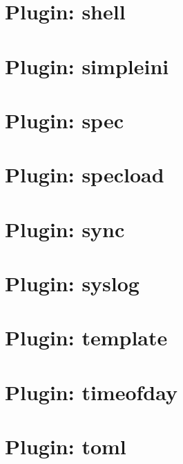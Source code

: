 \let\mypdfximage\pdfximage\def\pdfximage{\immediate\mypdfximage}\documentclass[twoside]{book}
\newcommand{\+}{\discretionary{\mbox{\scriptsize$\hookleftarrow$}}{}{}}
\begin{document}
\chapter{Plugin\+: shell}
\label{md_src_plugins_shell_README}

\chapter{Plugin\+: simpleini}
\label{md_src_plugins_simpleini_README}

\chapter{Plugin\+: spec}
\label{md_src_plugins_spec_README}

\chapter{Plugin\+: specload}
\label{md_src_plugins_specload_README}

\chapter{Plugin\+: sync}
\label{md_src_plugins_sync_README}

\chapter{Plugin\+: syslog}
\label{md_src_plugins_syslog_README}

\chapter{Plugin\+: template}
\label{md_src_plugins_template_README}

\chapter{Plugin\+: timeofday}
\label{md_src_plugins_timeofday_README}

\chapter{Plugin\+: toml}
\label{md_src_plugins_toml_README}

\end{document}
